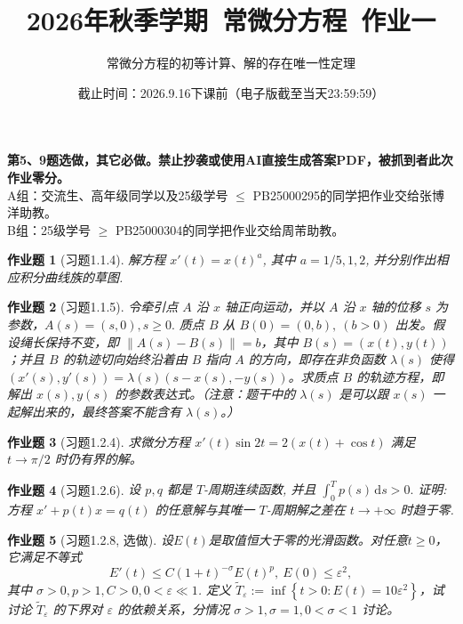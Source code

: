 \documentclass[UTF8,fontset=windows,12pt]{ctexart}
\theoremstyle{kaiti-theorem}
\newtheorem{problem}{作业题}
\numberwithin{equation}{section}
\newcommand{\ds}{\,\mathrm{d}s}
\newcommand{\eps}{\varepsilon}
\begin{document}
\title{\LARGE{\bf  2026年秋季学期~常微分方程~作业一}}
\author{常微分方程的初等计算、解的存在唯一性定理}
\date{截止时间：2026.9.16下课前（电子版截至当天23:59:59）}

\maketitle

\textbf{第5、9题选做，其它必做。禁止抄袭或使用AI直接生成答案PDF，被抓到者此次作业零分。}\\
A组：交流生、高年级同学以及25级学号 $\leqslant$ PB25000295的同学把作业交给张博洋助教。\\
B组：25级学号 $\geqslant$ PB25000304的同学把作业交给周芾助教。

\begin{problem}[习题1.1.4] 
解方程 $x'(t)=x(t)^a$, 其中 $a=1/5, 1, 2$, 并分别作出相应积分曲线族的草图.
\end{problem}

\begin{problem}[习题1.1.5]
令牵引点 $A$ 沿 $x$ 轴正向运动，并以 $A$ 沿 $x$ 轴的位移 $s$ 为参数，$A(s)=(s,0),s\geqslant0.$ 质点 $B$ 从 $ B(0)=(0,b),~(b>0)$ 出发。假设绳长保持不变，即 $\|A(s)-B(s)\|=b$，其中 $B(s)=(x(t),y(t))$；并且 $B$ 的轨迹切向始终沿着由 $B$ 指向 $A$ 的方向，即存在非负函数 $\lambda(s)$ 使得 $(x'(s),y'(s))=\lambda(s)(s-x(s), -y(s))$。求质点 $B$ 的轨迹方程，即解出 $x(s), y(s)$ 的参数表达式。（注意：题干中的 $\lambda(s)$ 是可以跟 $x(s)$ 一起解出来的，最终答案不能含有 $\lambda(s)$。）
\end{problem}

\begin{problem}[习题1.2.4]
求微分方程 $x'(t)\sin 2t=2(x(t)+\cos t)$ 满足 $t\to\pi/2$ 时仍有界的解。
\end{problem}

\begin{problem}[习题1.2.6]
设 \(p, q\) 都是 \(T\)-周期连续函数, 并且 \(\int_0^T p(s)\ds>0. \) 证明: 方程 \(x'+p(t)x=q(t)\) 的任意解与其唯一 \(T\)-周期解之差在 \(t\to+\infty\) 时趋于零. 
\end{problem}


\begin{problem}[习题1.2.8, 选做] 设$E(t)$是取值恒大于零的光滑函数。对任意$t\geqslant 0$，它满足不等式 $$E'(t)\leqslant C(1+t)^{-\sigma}E(t)^p,~E(0)\leqslant\eps^2,$$ 其中 $\sigma>0, p>1, C>0, 0<\eps\ll 1$. 定义 $\tilde{T}_\varepsilon:=\inf\left\{t>0: E(t)=10\varepsilon^2\right\}$，试讨论 $\tilde{T}_\eps$ 的下界对 $\eps$ 的依赖关系，分情况 $\sigma>1, \sigma=1, 0<\sigma<1$ 讨论。
\end{problem}
\end{document}
